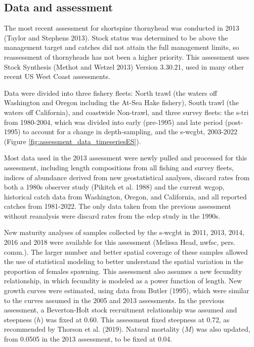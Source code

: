 \documentclass[11pt,
  letterpaper,
]{article}
\begin{document}
\hypertarget{data-and-assessment}{%
\subsection*{Data and assessment}\label{data-and-assessment}}

The most recent assessment for shortspine thornyhead was conducted in 2013 (Taylor and Stephens 2013). Stock status was determined to be above the management target and catches did not attain the full management limits, so reassessment of thornyheads has not been a higher priority. This assessment uses Stock Synthesis (Methot and Wetzel 2013) Version 3.30.21, used in many other recent US West Coast assessments.

Data were divided into three fishery fleets: North trawl (the waters off Washington and Oregon including the At-Sea Hake fishery), South trawl (the waters off California), and coastwide Non-trawl, and three survey fleets: the \gls{s-tri} from 1980-2004, which was divided into early (pre-1995) and late period (post-1995) to account for a change in depth-sampling, and the \gls{s-wcgbt}, 2003-2022 (Figure \ref{fig:assessment_data_timeseriesES}).

Most data used in the 2013 assessment were newly pulled and processed for this assessment, including length compositions from all fishing and survey fleets, indices of abundance derived from new geostatistical analyses, discard rates from both a 1980s observer study (Pikitch et al. 1988) and the current \gls{wcgop}, historical catch data from Washington, Oregon, and California, and all reported catches from 1981-2022. The only data taken from the previous assessment without reanalysis were discard rates from the \gls{edcp} study in the 1990s.

New maturity analyses of samples collected by the \gls{s-wcgbt} in 2011, 2013, 2014, 2016 and 2018 were available for this assessment (Melissa Head, \gls{nwfsc}, pers. comm.). The larger number and better spatial coverage of these samples allowed the use of statistical modeling to better understand the spatial variation in the proportion of females spawning. This assessment also assumes a new fecundity relationship, in which fecundity is modeled as a power function of length. New growth curves were estimated, using data from Butler (1995), which were similar to the curves assumed in the 2005 and 2013 assessments. In the previous assessment, a Beverton-Holt stock recruitment relationship was assumed and steepness (\(h\)) was fixed at 0.60. This assessment fixed steepness at 0.72, as recommended by Thorson et al. (2019). Natural mortality (\(M\)) was also updated, from 0.0505 in the 2013 assessment, to be fixed at 0.04.
\end{document}
